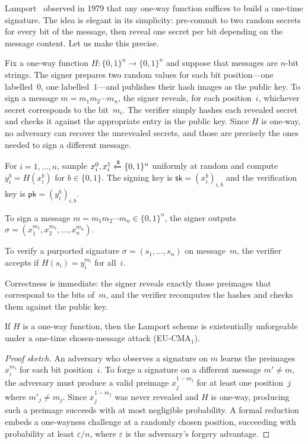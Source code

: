 Lamport~\cite{Lamport1979} observed in 1979 that any one-way function suffices to build a one-time signature.  The idea is elegant in its simplicity: pre-commit to two random secrets for every bit of the message, then reveal one secret per bit depending on the message content.  Let us make this precise.

Fix a one-way function $H\colon\{0,1\}^n\to\{0,1\}^n$ and suppose that messages are $n$-bit strings.  The signer prepares two random values for each bit position---one labelled~$0$, one labelled~$1$---and publishes their hash images as the public key.  To sign a message $m = m_1 m_2 \cdots m_n$, the signer reveals, for each position~$i$, whichever secret corresponds to the bit~$m_i$.  The verifier simply hashes each revealed secret and checks it against the appropriate entry in the public key.  Since $H$ is one-way, no adversary can recover the unrevealed secrets, and those are precisely the ones needed to sign a different message.

\begin{definition}
\label{def:lamport}
For $i = 1,\ldots,n$, sample $x_i^0, x_i^1 \getsr \{0,1\}^n$ uniformly at random and compute $y_i^b = H(x_i^b)$ for $b\in\{0,1\}$.  The signing key is $\mathsf{sk} = (x_i^b)_{i,b}$ and the verification key is $\mathsf{pk} = (y_i^b)_{i,b}$.

To sign a message $m = m_1 m_2 \cdots m_n \in \{0,1\}^n$, the signer outputs $\sigma = (x_1^{m_1}, x_2^{m_2}, \ldots, x_n^{m_n})$.

To verify a purported signature $\sigma = (s_1,\ldots,s_n)$ on message~$m$, the verifier accepts if $H(s_i) = y_i^{m_i}$ for all~$i$.
\end{definition}

Correctness is immediate: the signer reveals exactly those preimages that correspond to the bits of~$m$, and the verifier recomputes the hashes and checks them against the public key.

\begin{theorem}
\label{thm:lamport-security}
If $H$ is a one-way function, then the Lamport scheme is existentially unforgeable under a one-time chosen-message attack (EU-CMA$_1$).
\end{theorem}

\begin{proof}[Proof sketch]
An adversary who observes a signature on $m$ learns the preimages $x_i^{m_i}$ for each bit position~$i$.  To forge a signature on a different message $m' \neq m$, the adversary must produce a valid preimage $x_j^{1-m_j}$ for at least one position~$j$ where $m'_j \neq m_j$.  Since $x_j^{1-m_j}$ was never revealed and $H$ is one-way, producing such a preimage succeeds with at most negligible probability.  A formal reduction embeds a one-wayness challenge at a randomly chosen position, succeeding with probability at least $\varepsilon/n$, where $\varepsilon$ is the adversary's forgery advantage.
\end{proof}

